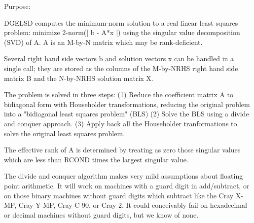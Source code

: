  \begin{DoxyParagraph}{Purpose\+: }
\begin{DoxyVerb} DGELSD computes the minimum-norm solution to a real linear least
 squares problem:
     minimize 2-norm(| b - A*x |)
 using the singular value decomposition (SVD) of A. A is an M-by-N
 matrix which may be rank-deficient.

 Several right hand side vectors b and solution vectors x can be
 handled in a single call; they are stored as the columns of the
 M-by-NRHS right hand side matrix B and the N-by-NRHS solution
 matrix X.

 The problem is solved in three steps:
 (1) Reduce the coefficient matrix A to bidiagonal form with
     Householder transformations, reducing the original problem
     into a "bidiagonal least squares problem" (BLS)
 (2) Solve the BLS using a divide and conquer approach.
 (3) Apply back all the Householder tranformations to solve
     the original least squares problem.

 The effective rank of A is determined by treating as zero those
 singular values which are less than RCOND times the largest singular
 value.

 The divide and conquer algorithm makes very mild assumptions about
 floating point arithmetic. It will work on machines with a guard
 digit in add/subtract, or on those binary machines without guard
 digits which subtract like the Cray X-MP, Cray Y-MP, Cray C-90, or
 Cray-2. It could conceivably fail on hexadecimal or decimal machines
 without guard digits, but we know of none.\end{DoxyVerb}
 
\end{DoxyParagraph}

